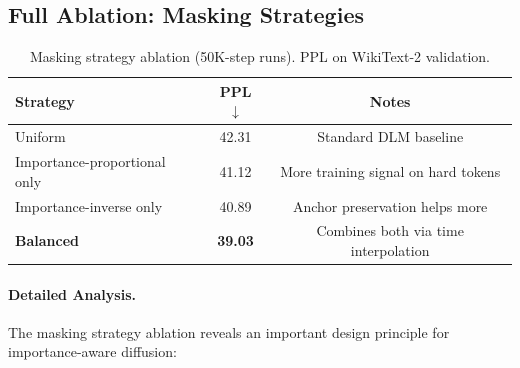 \subsection{Full Ablation: Masking Strategies}

\begin{table}[h]
\centering
\caption{Masking strategy ablation (50K-step runs). PPL on WikiText-2 validation.}
\label{tab:mask-ablation-full}
\begin{tabular}{lcc}
\toprule
\textbf{Strategy} & \textbf{PPL} $\downarrow$ & \textbf{Notes} \\
\midrule
Uniform & 42.31 & Standard DLM baseline \\
Importance-proportional only & 41.12 & More training signal on hard tokens \\
Importance-inverse only & 40.89 & Anchor preservation helps more \\
\textbf{Balanced} & \textbf{39.03} & Combines both via time interpolation \\
\bottomrule
\end{tabular}
\end{table}

\paragraph{Detailed Analysis.} The masking strategy ablation reveals an important design principle for importance-aware diffusion:

